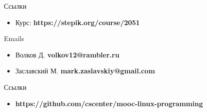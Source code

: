 \documentclass{beamer}
\begin{document}
\begin{frame}{Ссылки}
	\begin{itemize}
		\item Курс: \textbf{https://stepik.org/course/2051}
	\end{itemize}
\end{frame}

\begin{frame}{Emails}
	\begin{itemize}
		\item Волков Д. \textbf{volkov12@rambler.ru}
		\item Заславский М. \textbf{mark.zaslavskiy@gmail.com}
	\end{itemize}
\end{frame}

\begin{frame}{Ссылки}
	\begin{itemize}
		\item \textbf{https://github.com/cscenter/mooc-linux-programming}
	\end{itemize}
\end{frame}
\end{document}
